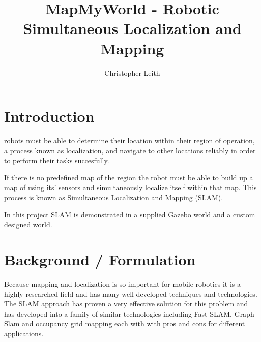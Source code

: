 \documentclass[10pt,journal,compsoc]{IEEEtran}
\begin{document}
\title{MapMyWorld - Robotic Simultaneous Localization and Mapping}

\author{Christopher Leith}

%
{}


\maketitle
\IEEEdisplaynontitleabstractindextext
\IEEEpeerreviewmaketitle
\label{sec:Introduction}
\section{Introduction}
 robots must be able to determine their location within their region of operation, a process known as localization, and navigate to other locations reliably in order to perform their tasks succesfully.

If there is no predefined map of the region the robot must be able to build up a map of using its' sensors and simultaneously localize itself within that map. This process is known as Simultaneous Localization and Mapping (SLAM).\hfill \vspace{\baselineskip}

In this project SLAM is demonstrated in a supplied Gazebo world and a custom designed world. 

\section{Background / Formulation}
Because mapping and localization is so important for mobile robotics it is a highly researched field and has many well developed techniques and technologies. The SLAM approach has proven a very effective solution for this problem and has developed into a family of similar technologies including Fast-SLAM, Graph-Slam and occupancy grid mapping each with with pros and cons for different applications. 
\end{document}
